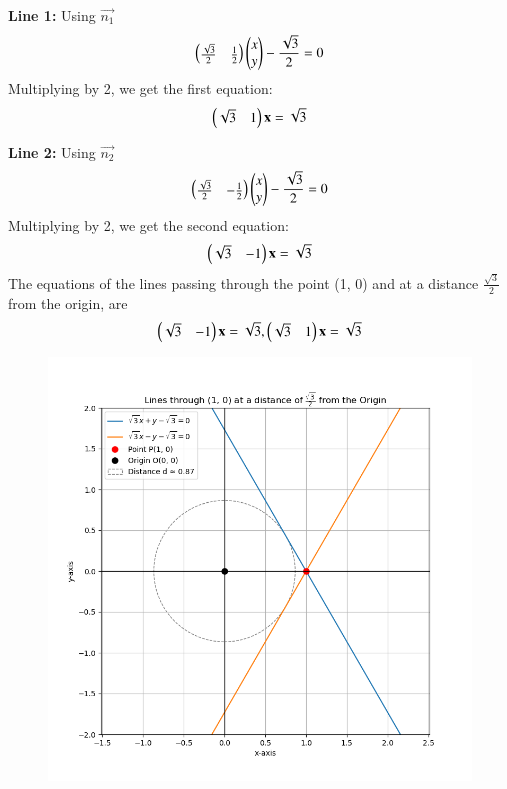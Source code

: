 \documentclass[journal]{IEEEtran}
\begin{document}
\textbf{Line 1:} Using $\vec{n_1}$
\begin{align}
\begin{pmatrix} \frac{\sqrt{3}}{2} & \frac{1}{2}\end{pmatrix} \begin{pmatrix}x \\ y\end{pmatrix} - \frac{\sqrt{3}}{2} = 0 
\end{align}
Multiplying by 2, we get the first equation:
\begin{align}
 \begin{pmatrix}\sqrt{3}&1\end{pmatrix}\mathbf{x}=\sqrt{3} 
 \end{align}

\textbf{Line 2:} Using $\vec{n_2}$
\begin{align}
\begin{pmatrix}\frac{\sqrt{3}}{2} & -\frac{1}{2}\end{pmatrix} \begin{pmatrix}x \\ y\end{pmatrix} - \frac{\sqrt{3}}{2} = 0
\end{align}
Multiplying by 2, we get the second equation:
\begin{align}   
 \begin{pmatrix}\sqrt{3}&-1\end{pmatrix}\mathbf{x}=\sqrt{3} 
\end{align}
The equations of the lines passing through the point (1, 0) and at a distance $\frac{\sqrt{3}}{2}$ from the origin, are 
\begin{align}
     \begin{pmatrix}\sqrt{3}&-1\end{pmatrix}\mathbf{x}=\sqrt{3} ,\begin{pmatrix}\sqrt{3}&1\end{pmatrix}\mathbf{x}=\sqrt{3}
\end{align}
\newpage
 \begin{figure}
    \centering
    \includegraphics[width=0.9\columnwidth]{figs/Figure_1.png}
    \label{fig:placeholder}
    \caption{}
\end{figure}
\end{document}
